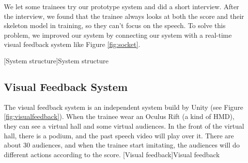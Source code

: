 \newpage
\par We let some trainees try our prototype system and did a short interview. After the interview, we found that the trainee always looks at both the score and their skeleton model in training, so they can't focus on the speech. To solve this problem, we improved our system by connecting our system with a real-time visual feedback system like Figure \ref{fig:socket}.

[System structure]{System structure}


\newpage
\subsection*{Visual Feedback System \cite{YiHuang2018}}
\par The visual feedback system is an independent system build by Unity (see Figure \ref{fig:visualfeedback}). When the trainee wear an Oculus Rift (a kind of HMD), they can see a virtual hall and some virtual audiences. In the front of the virtual hall, there is a podium, and the past speech video will play over it. There are about 30 audiences, and when the trainee start imitating, the audiences will do different actions according to the score.
[Visual feedback]{Visual feedback \cite{YiHuang2018}}

